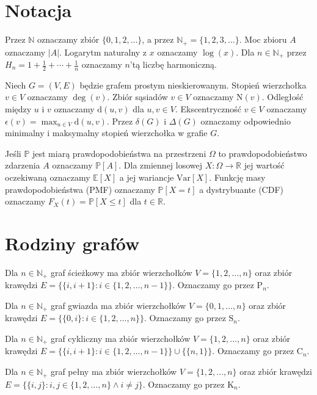\section{Notacja}

Przez $\mathbb{N}$ oznaczamy zbiór $\{0,1,2,\dots\}$, a przez $\mathbb{N}_+ = \{1,2,3,\dots\}$. Moc zbioru $A$ oznaczamy $|A|$. Logarytm naturalny z $x$ oznaczamy $\log(x)$. 
Dla $n\in\mathbb{N}_+$ przez $H_n=1+\frac{1}{2}+\cdots+\frac{1}{n}$ oznaczamy $n$'tą liczbę harmoniczną.

Niech $G=(V,E)$ będzie grafem prostym nieskierowanym. Stopień wierzchołka $v \in V$ oznaczamy $\deg(v)$. Zbiór sąsiadów $v\in V$ oznaczamy $\mathrm{N}(v)$. Odległość między $u$ i $v$ oznaczamy $\mathrm{d}(u,v)$ dla $u,v\in V$. Ekscentryczność $v\in V$ oznaczamy $\epsilon(v) = \max_{u\in V} \mathrm{d}(u,v)$. Przez $\delta(G)$ i $\Delta(G)$ oznaczamy odpowiednio minimalny i maksymalny stopień wierzchołka w grafie $G$.

Jeśli $\mathbb{P}$ jest miarą prawdopodobieństwa na przestrzeni $\Omega$ to prawdopodobieństwo zdarzenia $A$ oznaczamy $\mathbb{P}[A]$. Dla zmiennej losowej $X:\Omega\to\mathbb{R}$ jej wartość oczekiwaną oznaczamy $\mathbb{E}[X]$ a jej wariancje $\mathrm{Var}[X]$. Funkcję masy prawdopodobieństwa (PMF) oznaczamy $\mathbb{P}[X=t]$ a dystrybuante (CDF) oznaczamy $F_X(t)=\mathbb{P}[X\le t]$ dla $t\in\mathbb{R}$. 


\section{Rodziny grafów}

Dla $n \in \mathbb{N}_+$ graf ścieżkowy ma zbiór wierzchołków $V = \{1, 2, \dots, n\}$ oraz zbiór krawędzi $E = \{\{i, i+1\} : i \in \{1, 2, \dots, n-1\}\}$. Oznaczamy go przez $\mathrm{P}_n$.

Dla $n \in \mathbb{N}_+$ graf gwiazda ma zbiór wierzchołków $V = \{0, 1, \dots, n\}$ oraz zbiór krawędzi $E = \{\{0, i\} : i \in \{1, 2, \dots, n\}\}$. Oznaczamy go przez $\mathrm{S}_n$.

Dla $n \in \mathbb{N}_+$ graf cykliczny ma zbiór wierzchołków $V = \{1, 2, \dots, n\}$ oraz zbiór krawędzi 
$E = \{\{i, i+1\} : i \in \{1, 2, \dots, n-1\}\} \cup \{\{n, 1\}\}$. Oznaczamy go przez $\mathrm{C}_n$.

Dla $n \in \mathbb{N}_+$ graf pełny ma zbiór wierzchołków $V = \{1, 2, \dots, n\}$ oraz zbiór krawędzi $E = \{\{i, j\} : i, j \in \{1, 2, \dots, n\} \land i \ne j\}$. Oznaczamy go przez $\mathrm{K}_n$.


